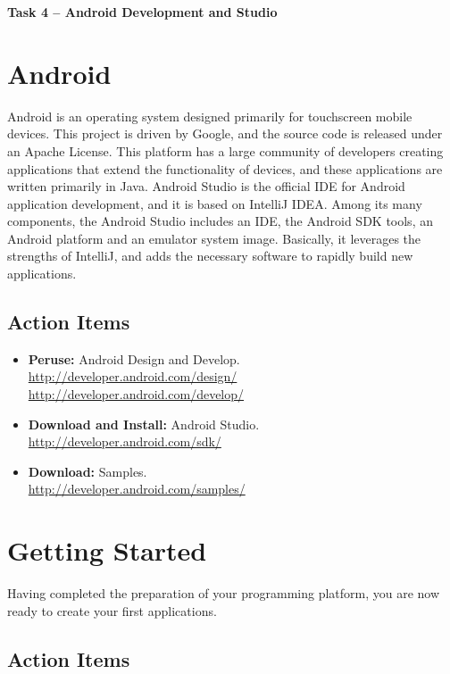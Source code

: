 \documentclass[11pt]{article}
\begin{document}
\begin{center}
{\bfseries \LARGE Task 4 -- Android Development and Studio \\[8mm]}
\end{center}


\section{Android}

Android is an operating system designed primarily for touchscreen mobile devices.
This project is driven by Google, and the source code is released under an Apache License.
This platform has a large community of developers creating applications that extend the functionality of devices, and these applications are written primarily in Java.
Android Studio is the official IDE for Android application development, and it is based on IntelliJ IDEA.
Among its many components, the Android Studio includes an IDE, the Android SDK tools, an Android platform and an emulator system image.
Basically, it leverages the strengths of IntelliJ, and adds the necessary software to rapidly build new applications.

\subsection*{Action Items}

\begin{itemize}
\item \textbf{Peruse:} Android Design and Develop.\\
\url{http://developer.android.com/design/} \\
\url{http://developer.android.com/develop/}
\item \textbf{Download and Install:} Android Studio.\\
\url{http://developer.android.com/sdk/}
\item \textbf{Download:} Samples.\\
\url{http://developer.android.com/samples/}
\end{itemize}


\section{Getting Started}

Having completed the preparation of your programming platform, you are now ready to create your first applications.

\subsection*{Action Items}
\end{document}
